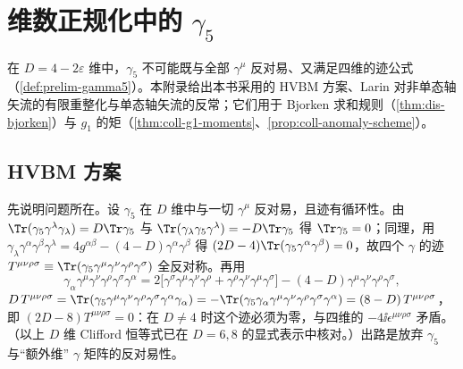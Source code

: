 \chapter{维数正规化中的 $\gamma_5$}\label{app:appI}

在 $D=4-2\varepsilon$ 维中，$\gamma_5$ 不可能既与全部 $\gamma^\mu$ 反对易、又满足四维的迹公式（\cref{def:prelim-gamma5}）。本附录给出本书采用的 HVBM 方案、Larin 对非单态轴矢流的有限重整化与单态轴矢流的反常；它们用于 Bjorken 求和规则（\cref{thm:dis-bjorken}）与 $g_1$ 的矩（\cref{thm:coll-g1-moments}、\cref{prop:coll-anomaly-scheme}）。

\section{HVBM 方案}\label{sec:appI-hvbm}

先说明问题所在。设 $\gamma_5$ 在 $D$ 维中与一切 $\gamma^\mu$ 反对易，且迹有循环性。由 $\Tr(\gamma_5\gamma^\lambda\gamma_\lambda)=D\Tr\gamma_5$ 与 $\Tr(\gamma_\lambda\gamma_5\gamma^\lambda)=-D\Tr\gamma_5$ 得 $\Tr\gamma_5=0$；同理，用 $\gamma_\lambda\gamma^\alpha\gamma^\beta\gamma^\lambda=4g^{\alpha\beta}-(4-D)\gamma^\alpha\gamma^\beta$ 得 $(2D-4)\Tr(\gamma_5\gamma^\alpha\gamma^\beta)=0$，故四个 $\gamma$ 的迹 $T^{\mu\nu\rho\sigma}\equiv\Tr(\gamma_5\gamma^\mu\gamma^\nu\gamma^\rho\gamma^\sigma)$ 全反对称。再用
\[
\gamma_\alpha\gamma^\mu\gamma^\nu\gamma^\rho\gamma^\sigma\gamma^\alpha=2\big[\gamma^\sigma\gamma^\mu\gamma^\nu\gamma^\rho+\gamma^\rho\gamma^\nu\gamma^\mu\gamma^\sigma\big]-(4-D)\gamma^\mu\gamma^\nu\gamma^\rho\gamma^\sigma ,
\]
$D\,T^{\mu\nu\rho\sigma}=\Tr(\gamma_5\gamma^\mu\gamma^\nu\gamma^\rho\gamma^\sigma\gamma^\alpha\gamma_\alpha)=-\Tr(\gamma_5\gamma_\alpha\gamma^\mu\gamma^\nu\gamma^\rho\gamma^\sigma\gamma^\alpha)=(8-D)\,T^{\mu\nu\rho\sigma}$，即 $(2D-8)T^{\mu\nu\rho\sigma}=0$：在 $D\ne4$ 时这个迹必须为零，与四维的 $-4\ii\epsilon^{\mu\nu\rho\sigma}$ 矛盾。（以上 $D$ 维 Clifford 恒等式已在 $D=6,8$ 的显式表示中核对。）出路是放弃 $\gamma_5$ 与“额外维” $\gamma$ 矩阵的反对易性。

